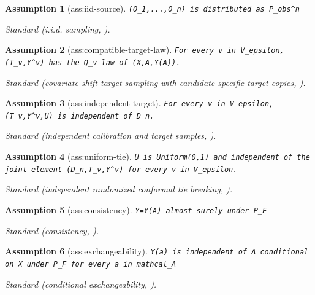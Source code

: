 \documentclass{article}
\newtheorem{assumption}{Assumption}
\begin{document}
\begin{assumption}[ass:iid-source]\label{ass:iid-source}
\texttt{(O\_1,...,O\_n) is distributed as P\_obs\textasciicircum{}n}
\par\smallskip\noindent\emph{Standard} (i.i.d. sampling, \cite{tibshirani2019covariateshift}).
\end{assumption}

\begin{assumption}[ass:compatible-target-law]\label{ass:compatible-target-law}
\texttt{For every v in V\_epsilon, (T\_v,Y\textasciicircum{}v) has the Q\_v-law of (X,A,Y(A)).}
\par\smallskip\noindent\emph{Standard} (covariate-shift target sampling with candidate-specific target copies, \cite{tibshirani2019covariateshift}).
\end{assumption}

\begin{assumption}[ass:independent-target]\label{ass:independent-target}
\texttt{For every v in V\_epsilon, (T\_v,Y\textasciicircum{}v,U) is independent of D\_n.}
\par\smallskip\noindent\emph{Standard} (independent calibration and target samples, \cite{tibshirani2019covariateshift}).
\end{assumption}

\begin{assumption}[ass:uniform-tie]\label{ass:uniform-tie}
\texttt{U is Uniform(0,1) and independent of the joint element (D\_n,T\_v,Y\textasciicircum{}v) for every v in V\_epsilon.}
\par\smallskip\noindent\emph{Standard} (independent randomized conformal tie breaking, \cite{tibshirani2019covariateshift}).
\end{assumption}

\begin{assumption}[ass:consistency]\label{ass:consistency}
\texttt{Y=Y(A) almost surely under P\_F}
\par\smallskip\noindent\emph{Standard} (consistency, \cite{schroder2025conformal}).
\end{assumption}

\begin{assumption}[ass:exchangeability]\label{ass:exchangeability}
\texttt{Y(a) is independent of A conditional on X under P\_F for every a in mathcal\_A}
\par\smallskip\noindent\emph{Standard} (conditional exchangeability, \cite{schroder2025conformal}).
\end{assumption}
\end{document}
